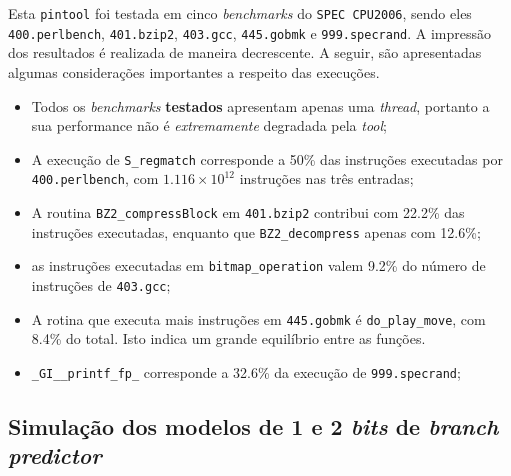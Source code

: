 \documentclass[12pt]{article}
\begin{document}
Esta \texttt{pintool} foi testada em cinco \textit{benchmarks} do
\texttt{SPEC CPU2006}, sendo eles \texttt{400.perlbench}, \texttt{401.bzip2},
\texttt{403.gcc}, \texttt{445.gobmk} e \texttt{999.specrand}. A impressão dos
resultados é realizada de maneira decrescente. A seguir, são apresentadas algumas
considerações importantes a respeito das execuções.

\begin {itemize}
  \item Todos os \textit{benchmarks} \textbf{testados} apresentam apenas uma
  \textit{thread}, portanto a sua performance não é \textit{extremamente}
  degradada pela \textit{tool};
  \item A execução de \texttt{S\_regmatch} corresponde a 50\% das
  instruções executadas por \texttt{400.perlbench}, com \(1.116\times10^{12}\)
  instruções nas três entradas;
  \item A routina \texttt{BZ2\_compressBlock} em \texttt{401.bzip2} contribui
  com 22.2\% das instruções executadas, enquanto que \texttt{BZ2\_decompress}
  apenas com 12.6\%;
  \item as instruções executadas em \texttt{bitmap\_operation} valem 9.2\% do
  número de instruções de \texttt{403.gcc};
  \item A rotina que executa mais instruções em \texttt{445.gobmk} é
  \texttt{do\_play\_move}, com 8.4\% do total. Isto indica um grande equilíbrio
  entre as funções.
  \item \texttt{\_GI\_\_printf\_fp\_} corresponde a 32.6\% da execução de
  \texttt{999.specrand};
\end{itemize}

\subsection{Simulação dos modelos de 1 e 2 \textit{bits} de \textit{branch
predictor}}
\end{document}
